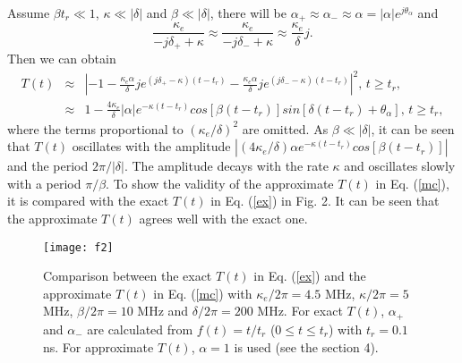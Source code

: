 \documentclass[aps,onecolumn,superscriptaddress,showpacs]{revtex4}
\begin{document}
Assume $\beta t_r\ll 1$, $\kappa\ll |\delta|$ and $\beta\ll |\delta|$, there will be $\alpha_{+}\approx \alpha_{-} \approx \alpha=|\alpha|e^{j\theta_{\alpha}}$ and
\begin{equation}
\frac{\kappa_e}{-j\delta_{+}+\kappa}\approx \frac{\kappa_e}{-j\delta_{-}+\kappa} \approx \frac{\kappa_e}{\delta}j.
\end{equation}
Then we can obtain
\begin{eqnarray}
T(t) & \approx & \left |-1-\frac{\kappa_e \alpha}{\delta}j  e^{(j\delta_{+}-\kappa) (t-t_r) }
-\frac{\kappa_e \alpha}{\delta}j e^{(j\delta_{-}-\kappa) (t-t_r) } \right |^2,  \, t\geq t_r, \\
& \approx & 1-\frac{4 \kappa_e}{\delta}|\alpha|e^{-\kappa (t-t_r) }cos[\beta(t-t_r)]sin[\delta(t-t_r)+\theta_{\alpha}],\, t\geq t_r, \label{mc}
\end{eqnarray}
where the terms proportional to $(\kappa_e/\delta)^2$ are omitted. As $\beta\ll |\delta|$,
it can be seen that $T(t)$ oscillates with the amplitude
$|(4 \kappa_e/\delta) \alpha e^{-\kappa (t-t_r) }cos[\beta(t-t_r)]|$ and the period $2\pi/|\delta|$.
The amplitude decays with the rate $\kappa$ and oscillates slowly with a period $\pi/\beta$. To show the validity of the approximate $T(t)$ in Eq. (\ref{mc}), it is compared with
the exact $T(t)$ in Eq. (\ref{ex}) in Fig. 2.
It can be seen that the approximate $T(t)$ agrees well with the exact one.
\begin{figure}[htbp]
\centering\texttt{[image: f2]}
\caption{Comparison between the exact $T(t)$ in Eq. (\ref{ex}) and the approximate $T(t)$ in Eq. (\ref{mc}) with $\kappa_e/2\pi=4.5$ MHz, $\kappa/2\pi=5$ MHz, $\beta/2\pi=10$ MHz and
$\delta/2\pi=200$ MHz. For exact $T(t)$, $\alpha_{+}$ and $\alpha_{-}$ are calculated from $f(t)=t/t_r$ ($0\leq t \leq t_r$) with $t_r=0.1$ ns.
For approximate $T(t)$, $\alpha=1$ is used (see the section 4).}
\end{figure}
\end{document}
